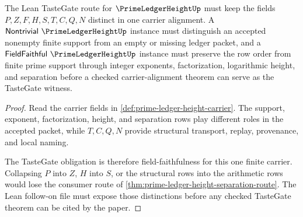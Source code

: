 \begin{theorem}
\label{thm:prime-ledger-height-tastegate-obligation}
The Lean TasteGate route for $\PrimeLedgerHeightUp$ must keep the fields $P,Z,F,H,S,T,C,Q,N$ distinct in one carrier alignment. A $\mathsf{Nontrivial}\ \PrimeLedgerHeightUp$ instance must distinguish an accepted nonempty finite support from an empty or missing ledger packet, and a $\mathsf{FieldFaithful}\ \PrimeLedgerHeightUp$ instance must preserve the row order from finite prime support through integer exponents, factorization, logarithmic height, and separation before a checked carrier-alignment theorem can serve as the TasteGate witness.
\end{theorem}
\begin{proof}
Read the carrier fields in \autoref{def:prime-ledger-height-carrier}. The support, exponent, factorization, height, and separation rows play different roles in the accepted packet, while $T,C,Q,N$ provide structural transport, replay, provenance, and local naming.

The TasteGate obligation is therefore field-faithfulness for this one finite carrier. Collapsing $P$ into $Z$, $H$ into $S$, or the structural rows into the arithmetic rows would lose the consumer route of \autoref{thm:prime-ledger-height-separation-route}. The Lean follow-on file must expose those distinctions before any checked TasteGate theorem can be cited by the paper.
\end{proof}




